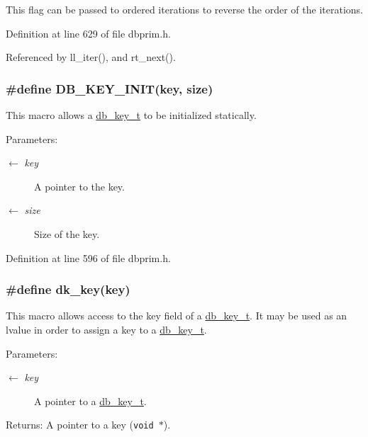 This flag can be passed to ordered iterations to reverse the order of the iterations.

Definition at line 629 of file dbprim.h.

Referenced by ll\_\-iter(), and rt\_\-next().\hypertarget{group__dbprim_ga1}{
\subsubsection[DB\_\-KEY\_\-INIT]{\setlength{\rightskip}{0pt plus 5cm}\#define DB\_\-KEY\_\-INIT(key, size)}}
\label{group__dbprim_ga1}


This macro allows a \hyperlink{group__dbprim_ga0}{db\_\-key\_\-t} to be initialized statically.

\begin{Desc}
\item[Parameters:]
\begin{description}
\item[\mbox{$\leftarrow$} {\em key}]A pointer to the key. \item[\mbox{$\leftarrow$} {\em size}]Size of the key.\end{description}
\end{Desc}


Definition at line 596 of file dbprim.h.\hypertarget{group__dbprim_ga2}{
\subsubsection[dk\_\-key]{\setlength{\rightskip}{0pt plus 5cm}\#define dk\_\-key(key)}}
\label{group__dbprim_ga2}


This macro allows access to the key field of a \hyperlink{group__dbprim_ga0}{db\_\-key\_\-t}. It may be used as an lvalue in order to assign a key to a \hyperlink{group__dbprim_ga0}{db\_\-key\_\-t}.

\begin{Desc}
\item[Parameters:]
\begin{description}
\item[\mbox{$\leftarrow$} {\em key}]A pointer to a \hyperlink{group__dbprim_ga0}{db\_\-key\_\-t}.\end{description}
\end{Desc}
\begin{Desc}
\item[Returns:]A pointer to a key ({\tt void $\ast$}).\end{Desc}


